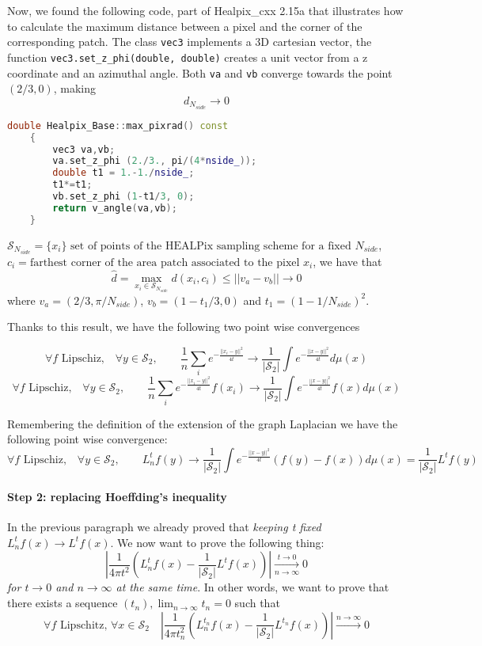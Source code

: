 Now, we found the following code, part of Healpix\_cxx 2.15a \cite{Healpix_cc} that illustrates how to calculate the maximum distance between a pixel and the corner of the corresponding patch. The class \lstinline|vec3| implements a 3D cartesian vector, the function \lstinline|vec3.set_z_phi(double, double)| creates a unit vector from a z coordinate and an azimuthal angle. Both \lstinline|va| and \lstinline|vb| converge towards the point $(2/3, 0)$, making $$d_{N_{side}}\rightarrow0$$
\begin{lstlisting}[language=c++]
	double Healpix_Base::max_pixrad() const
	{
		vec3 va,vb;
		va.set_z_phi (2./3., pi/(4*nside_));
		double t1 = 1.-1./nside_;
		t1*=t1;
		vb.set_z_phi (1-t1/3, 0);
		return v_angle(va,vb);
	}
\end{lstlisting}
$\mathcal S_{N_{side}} = \{x_i\}  \text{ set of points of the HEALPix sampling scheme for a fixed }N_{side}$,\\$c_i = \text{farthest corner of the area patch associated to the pixel }x_i$, we have that 
$$\hat d=\max_{x_i\in \mathcal S_{N_{side}}}d(x_i, c_i) \leq ||v_a-v_b||\rightarrow 0$$
where $v_a = (2/3, \pi/N_{side})$, $v_b = (1-t_1/3, 0)$ and $t_1=(1-1/N_{side})^2$.

Thanks to this result, we have the following two point wise convergences

$$\forall f \text{ Lipschiz,}\quad \forall y\in\mathcal S_2,  \quad\quad \frac{1}{n}\sum_i e^{-\frac{||x_i-y||^2}{4t}}\rightarrow \frac{1}{|\mathcal S_2|}\int e^{-\frac{||x-y||^2}{4t}}d\mu(x)$$
$$\forall f \text{ Lipschiz,}\quad \forall y\in\mathcal S_2,  \quad\quad \frac{1}{n}\sum_i e^{-\frac{||x_i-y||^2}{4t}}f(x_i)\rightarrow \frac{1}{|\mathcal S_2|}\int e^{-\frac{||x-y||^2}{4t}}f(x)d\mu(x)$$

Remembering the definition of the extension of the graph Laplacian we have the following point wise convergence:
$$\forall f \text{ Lipschiz,}\quad \forall y\in\mathcal S_2,  \quad\quad L_n^tf(y)\rightarrow \frac{1}{|\mathcal S_2|}\int e^{-\frac{||x-y||^2}{4t}}\left(f(y)-f(x)\right)d\mu(x) = \frac{1}{|\mathcal S_2|} L^tf(y)$$
\paragraph{Step 2: replacing Hoeffding's inequality}
In the previous paragraph we already proved that \textit{keeping t fixed} $L_n^tf(x)\rightarrow L^tf(x)$. We now want to prove the following thing:
$$\left|\frac{1}{4\pi t^2}\left(L_n^tf(x) - \frac{1}{|\mathcal S_2|}L^tf(x)\right)\right|\xrightarrow[n\to \infty]{t\to 0}0$$
\textit{for $t\to0$ and $n\to\infty$ at the same time}. In other words, we want to prove that there exists a sequence $(t_n), \lim_{n\to\infty}t_n=0$ such that 
$$\forall f \text{ Lipschitz, } \forall x\in\mathcal S_2 \quad \left|\frac{1}{4\pi t_n^2}\left(L_n^{t_n}f(x) -\frac{1}{|\mathcal S_2|} L^{t_n}f(x)\right)\right|\xrightarrow{n\to \infty}0$$

